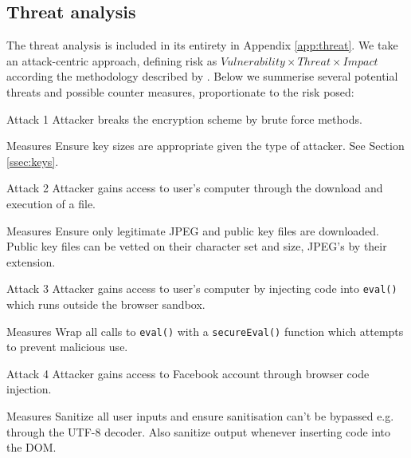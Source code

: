 \FloatBarrier
\subsection{Threat analysis}
\label{ssec:threat}

The threat analysis is included in its entirety in Appendix \ref{app:threat}. We take an attack-centric approach, defining risk as $Vulnerability \times Threat \times Impact$ according the methodology described by \cite{security}. Below we summerise several potential threats and possible counter measures, proportionate to the risk posed:


\begin{sdesc} \addtolength{\itemsep}{-0.5\baselineskip}
    \item[Attack 1] Attacker breaks the encryption scheme by brute force methods.
    \item[Measures] Ensure key sizes are appropriate given the type of attacker. See Section \ref{ssec:keys}.
\end{sdesc}

\begin{sdesc} \addtolength{\itemsep}{-0.5\baselineskip}
    \item[Attack 2] Attacker gains access to user's computer through the download and execution of a file.
    \item[Measures] Ensure only legitimate JPEG and public key files are downloaded. Public key files can be vetted on their character set and size, JPEG's by their extension.
\end{sdesc}

\begin{sdesc} \addtolength{\itemsep}{-0.5\baselineskip}
    \item[Attack 3] Attacker gains access to user's computer by injecting code into {\tt eval()} which runs outside the browser sandbox.
    \item[Measures] Wrap all calls to {\tt eval()} with a {\tt secureEval()} function which attempts to prevent malicious use. 
\end{sdesc}

\begin{sdesc} \addtolength{\itemsep}{-0.5\baselineskip}
    \item[Attack 4] Attacker gains access to Facebook account through browser code injection.
    \item[Measures] Sanitize all user inputs and ensure sanitisation can't be bypassed e.g. through the UTF-8 decoder\cite{utf8}. Also sanitize output whenever inserting code into the DOM.
\end{sdesc}

